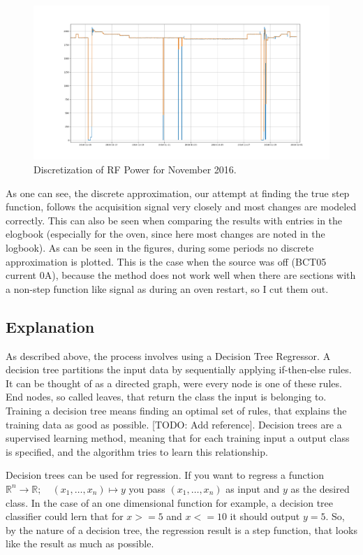\documentclass[12pt,a4paper]{article}
\begin{document}
\begin{figure}
\centering
\includegraphics{images/rf_discrete_nov2016.png}
\caption{Discretization of RF Power for November 2016.}
\end{figure}

As one can see, the discrete approximation, our attempt at finding the
true step function, follows the acquisition signal very closely and most
changes are modeled correctly. This can also be seen when comparing the
results with entries in the elogbook (especially for the oven, since
here most changes are noted in the logbook). As can be seen in the
figures, during some periods no discrete approximation is plotted. This
is the case when the source was off (BCT05 current 0A), because the
method does not work well when there are sections with a non-step
function like signal as during an oven restart, so I cut them out.

\hypertarget{explanation}{%
\subsection{Explanation}\label{explanation}}

As described above, the process involves using a Decision Tree
Regressor. A decision tree partitions the input data by sequentially
applying if-then-else rules. It can be thought of as a directed graph,
were every node is one of these rules. End nodes, so called leaves, that
return the class the input is belonging to. Training a decision tree
means finding an optimal set of rules, that explains the training data
as good as possible. {[}TODO: Add reference{]}. Decision trees are a
supervised learning method, meaning that for each training input a
output class is specified, and the algorithm tries to learn this
relationship.

Decision trees can be used for regression. If you want to regress a
function
\(\mathbb R^n \to \mathbb R; \quad (x_1, \dots, x_n) \mapsto y\) you
pass \((x_1, \dots, x_n)\) as input and \(y\) as the desired class. In
the case of an one dimensional function for example, a decision tree
classifier could lern that for \(x>=5\) and \(x<=10\) it should output
\(y=5\). So, by the nature of a decision tree, the regression result is
a step function, that looks like the result as much as possible.
\end{document}
